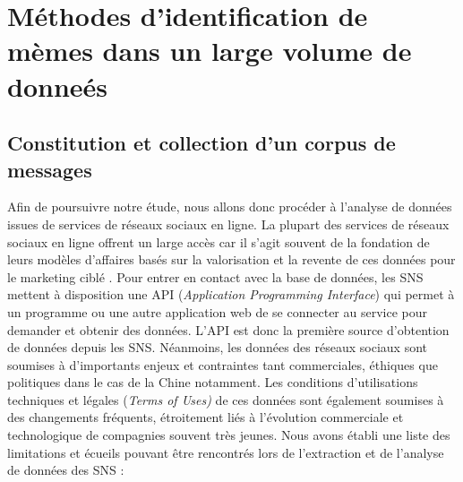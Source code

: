 \section{Méthodes d'identification de mèmes dans un large volume de donneés}

\subsection[Constitution et collection d{\textquoteright}un corpus de messages]{Constitution et collection d{\textquoteright}un corpus de messages}

Afin de poursuivre notre étude, nous allons donc procéder à l{\textquoteright}analyse de données issues de services de réseaux sociaux en ligne. La plupart des services de réseaux sociaux en ligne offrent un large accès car il s{\textquoteright}agit souvent de la fondation de leurs modèles d{\textquoteright}affaires basés sur la valorisation et la revente de ces données pour le marketing ciblé \citep{Ko2010}. Pour entrer en contact avec la base de données, les SNS mettent à disposition une API (\textit{Application Programming Interface}) qui permet à un programme ou une autre application web de se connecter au service pour demander et obtenir des données. L{\textquoteright}API est donc la première source d{\textquoteright}obtention de données depuis les SNS. Néanmoins, les données des réseaux sociaux sont soumises à d{\textquoteright}importants enjeux et contraintes tant commerciales, éthiques que politiques dans le cas de la Chine notamment. Les conditions d{\textquoteright}utilisations techniques et légales (\textit{Terms of Uses) }de ces données sont également soumises à des changements fréquents, étroitement liés à l{\textquoteright}évolution commerciale et technologique de compagnies souvent très jeunes. Nous avons établi une liste des limitations et écueils pouvant \^etre rencontrés lors de l{\textquoteright}extraction et de l{\textquoteright}analyse de données des SNS :

